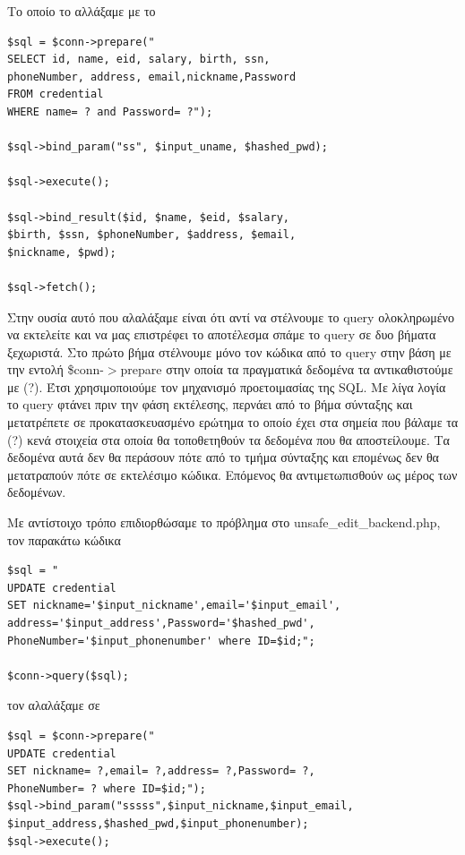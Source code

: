 Το οποίο το αλλάξαμε με το

\begin{center}
	\begin{lstlisting}
$sql = $conn->prepare("
SELECT id, name, eid, salary, birth, ssn, 
phoneNumber, address, email,nickname,Password
FROM credential
WHERE name= ? and Password= ?");

$sql->bind_param("ss", $input_uname, $hashed_pwd);

$sql->execute();

$sql->bind_result($id, $name, $eid, $salary, 
$birth, $ssn, $phoneNumber, $address, $email, 
$nickname, $pwd);

$sql->fetch();
	\end{lstlisting}	
\end{center}

\noindent
Στην ουσία αυτό που αλαλάξαμε είναι ότι αντί να στέλνουμε το query ολοκληρωμένο να εκτελείτε
και να μας επιστρέφει το αποτέλεσμα σπάμε το query σε δυο βήματα ξεχωριστά. Στο πρώτο βήμα
στέλνουμε μόνο τον κώδικα από το query στην βάση με την εντολή \$conn-$>$prepare στην οποία
τα πραγματικά δεδομένα τα αντικαθιστούμε με (?). Έτσι χρησιμοποιούμε τον μηχανισμό προετοιμασίας
της SQL. Με λίγα λογία το query φτάνει πριν την φάση εκτέλεσης, περνάει από το βήμα σύνταξης 
και μετατρέπετε σε προκατασκευασμένο ερώτημα το οποίο έχει στα σημεία που βάλαμε τα (?) κενά
στοιχεία στα οποία θα τοποθετηθούν τα δεδομένα που θα αποστείλουμε. Τα δεδομένα αυτά δεν
θα περάσουν πότε από το τμήμα σύνταξης και επομένως δεν θα μετατραπούν πότε σε εκτελέσιμο κώδικα.
Επόμενος θα αντιμετωπισθούν ως μέρος των δεδομένων.

\noindent
Με αντίστοιχο τρόπο επιδιορθώσαμε το πρόβλημα στο unsafe\_edit\_backend.php, τον
παρακάτω κώδικα

\begin{center}
	\begin{lstlisting}
$sql = "
UPDATE credential 
SET nickname='$input_nickname',email='$input_email',
address='$input_address',Password='$hashed_pwd',
PhoneNumber='$input_phonenumber' where ID=$id;";

$conn->query($sql);
	\end{lstlisting}	
\end{center}

\noindent 
τον αλαλάξαμε σε

 \begin{center}
	\begin{lstlisting}
$sql = $conn->prepare("
UPDATE credential 
SET nickname= ?,email= ?,address= ?,Password= ?,
PhoneNumber= ? where ID=$id;");
$sql->bind_param("sssss",$input_nickname,$input_email,
$input_address,$hashed_pwd,$input_phonenumber);
$sql->execute();
	\end{lstlisting}	
\end{center}

